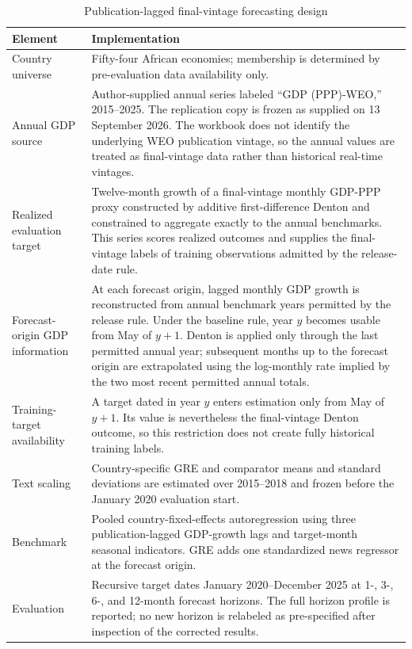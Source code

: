 \begin{table}[htbp]
\centering\scriptsize\singlespacing
\caption{Publication-lagged final-vintage forecasting design}
\label{tab:design}
\renewcommand{\arraystretch}{0.92}
\begin{tabularx}{\textwidth}{p{}X}
\toprule
Element & Implementation \\
\midrule
Country universe & Fifty-four African economies; membership is determined by pre-evaluation data availability only. \\
Annual GDP source & Author-supplied annual series labeled ``GDP (PPP)-WEO,'' 2015--2025. The replication copy is frozen as supplied on 13 September 2026. The workbook does not identify the underlying WEO publication vintage, so the annual values are treated as final-vintage data rather than historical real-time vintages. \\
Realized evaluation target & Twelve-month growth of a final-vintage monthly GDP-PPP proxy constructed by additive first-difference Denton and constrained to aggregate exactly to the annual benchmarks. This series scores realized outcomes and supplies the final-vintage labels of training observations admitted by the release-date rule. \\
Forecast-origin GDP information & At each forecast origin, lagged monthly GDP growth is reconstructed from annual benchmark years permitted by the release rule. Under the baseline rule, year $y$ becomes usable from May of $y+1$. Denton is applied only through the last permitted annual year; subsequent months up to the forecast origin are extrapolated using the log-monthly rate implied by the two most recent permitted annual totals. \\
Training-target availability & A target dated in year $y$ enters estimation only from May of $y+1$. Its value is nevertheless the final-vintage Denton outcome, so this restriction does not create fully historical training labels. \\
Text scaling & Country-specific GRE and comparator means and standard deviations are estimated over 2015--2018 and frozen before the January 2020 evaluation start. \\
Benchmark & Pooled country-fixed-effects autoregression using three publication-lagged GDP-growth lags and target-month seasonal indicators. GRE adds one standardized news regressor at the forecast origin. \\
Evaluation & Recursive target dates January 2020--December 2025 at 1-, 3-, 6-, and 12-month forecast horizons. The full horizon profile is reported; no new horizon is relabeled as pre-specified after inspection of the corrected results. \\

\end{tabularx}
\end{table}
